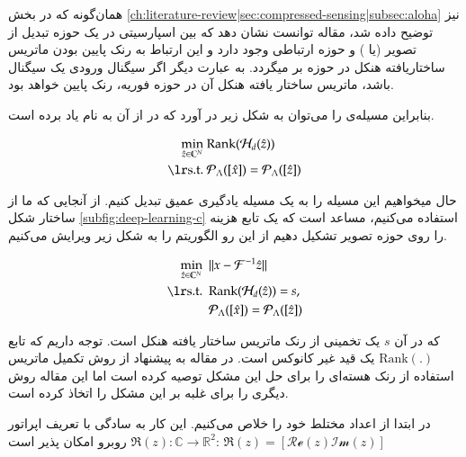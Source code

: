 همان‌گونه که در بخش \ref{ch:literature-review|sec:compressed-sensing|subsec:aloha} نیز توضیح داده شد،
مقاله \cite{Jin_2016}
توانست نشان دهد که بین اسپارسیتی در یک حوزه تبدیل از تصویر (یا
)
و حوزه \kspace ارتباطی وجود دارد و این ارتباط به رنک پایین بودن
ماتریس ساختاریافته هنکل
در حوزه \kspace بر میگردد. به عبارت دیگر اگر سیگنال ورودی یک سیگنال  باشد، ماتریس ساختار یافته هنکل آن در حوزه فوریه، رنک پایین خواهد بود.

بنابراین مسیله‌ی 
را می‌توان به شکل زیر در آورد که در \cite{Jin_2016} از آن به نام  یاد برده است.



\removevspace
\begin{subequations}
	\begin{align}
		\min_{\hat{z}\in\mathbb{C}^N} \ &\mathrm{Rank}(\mathcal{H}_d(\hat{z})) \\
		\lrtext{s.t.} \ & \Rho_\Lambda([\hat{x}]) = \Rho_\Lambda([\hat{z}])
	\end{align}
\end{subequations}


حال میخواهیم این مسيله را به یک مسیله یادگیری عمیق 
تبدیل کنیم. از آنجایی که ما از ساختار شکل \ref{subfig:deep-learning-c}
استفاده می‌کنیم، مساعد است که یک تابع هزینه را روی حوزه تصویر تشکیل دهیم از این رو الگوریتم  را به شکل زیر ویرایش می‌کنیم.


\removevspace
\begin{subequations}\label{eq:aloha-modify1}
	\begin{align}
		\min_{\hat{z}\in\mathbb{C}^N} \ \  & \| x - \F^{-1}{\hat{z}}\| \\
		\lrtext{s.t.} \ \  & \mathrm{Rank}(\mathcal{H}_d(\hat{z})) = s, \\
		& \Rho_\Lambda([\hat{x}]) = \Rho_\Lambda([\hat{z}])
	\end{align}
\end{subequations}

که در آن $s$ یک تخمینی از رنک ماتریس ساختار یافته هنکل است. توجه داریم که تابع
$\mathrm{Rank}(.)$
یک قید غیر کانوکس 
است. در مقاله \cite{Jin_2016}
به پیشنهاد از روش تکمیل ماتریس 
\cite{Cand_s_2009}
استفاده از رنک هسته‌ای
را برای حل این مشکل توصیه کرده است اما این مقاله روش دیگری را برای غلبه بر این مشکل را اتخاذ کرده است. 

در ابتدا از اعداد مختلط خود را خلاص می‌کنیم. این کار به سادگی با تعریف اپراتور $\Re(z): \mathbb{C}\rightarrow\mathbb{R}^2$
روبرو امکان پذیر است:
$\Re(z) = [\mathcal{Re}(z) \mathcal{Im}(z)]$

